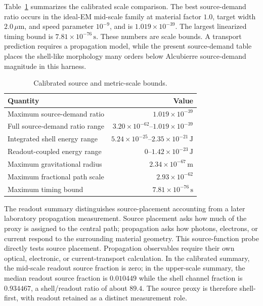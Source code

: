 \documentclass[11pt]{article}
\newcommand{\um}{\,\mu\mathrm{m}}
\begin{document}
Table~\ref{tab:scale_bound} summarizes the calibrated scale comparison. The
best source-demand ratio occurs in the ideal-EM mid-scale family at material
factor $1.0$, target width $2.0\um$, and speed parameter $10^{-9}$, and is
$1.019\times10^{-39}$. The largest linearized timing bound is
$7.81\times10^{-76}\,\mathrm{s}$. These numbers are scale bounds. A transport
prediction requires a propagation model, while the present source-demand table
places the shell-like morphology many orders below Alcubierre source-demand
magnitude in this harness.

\begin{table}[htbp]
\centering
\caption{Calibrated source and metric-scale bounds.}
\label{tab:scale_bound}
\small
\begin{tabular}{lr}
\toprule
Quantity & Value \\
\midrule
Maximum source-demand ratio & $1.019\times10^{-39}$ \\
Full source-demand ratio range & $3.20\times10^{-62}$--$1.019\times10^{-39}$ \\
Integrated shell energy range & $5.24\times10^{-25}$--$2.35\times10^{-21}\,\mathrm{J}$ \\
Readout-coupled energy range & $0$--$1.42\times10^{-23}\,\mathrm{J}$ \\
Maximum gravitational radius & $2.34\times10^{-67}\,\mathrm{m}$ \\
Maximum fractional path scale & $2.93\times10^{-62}$ \\
Maximum timing bound & $7.81\times10^{-76}\,\mathrm{s}$ \\
\bottomrule
\end{tabular}
\end{table}

The readout summary distinguishes source-placement accounting from a later
laboratory propagation measurement. Source placement asks how much of the proxy
is assigned to the central path; propagation asks how photons, electrons, or
current respond to the surrounding material geometry. This source-function
probe directly tests source placement. Propagation observables require their
own optical, electronic, or current-transport calculation. In the
calibrated summary, the mid-scale readout source fraction is zero; in the
upper-scale summary, the median readout source fraction is $0.010449$ while the
shell channel fraction is $0.934467$, a shell/readout ratio of about $89.4$.
The source proxy is therefore shell-first, with readout retained as a distinct
measurement role.
\end{document}
